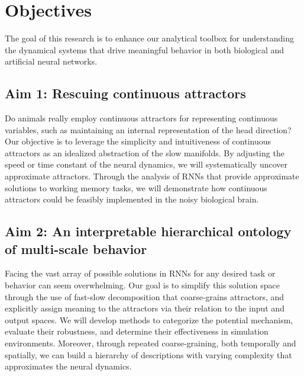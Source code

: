 \documentclass[12pt,letterpaper, onecolumn]{article}
\theoremstyle{definition}
\theoremstyle{remark}
\begin{document}
%


\newpage
\section{Objectives}

The goal of this research is to enhance our analytical toolbox for understanding the dynamical systems that drive meaningful behavior in both biological and artificial neural networks.

\subsection*{Aim 1: Rescuing continuous attractors}
Do animals really employ continuous attractors for representing continuous variables, such as maintaining an internal representation of the head direction?
Our objective is to leverage the simplicity and intuitiveness of continuous attractors as an idealized abstraction of the slow manifolds.
By adjusting the speed or time constant of the neural dynamics, we will systematically uncover approximate attractors.
Through the analysis of RNNs that provide approximate solutions to working memory tasks, we will demonstrate how continuous attractors could be feasibly implemented in the noisy biological brain.

\subsection*{Aim 2: An interpretable hierarchical ontology of multi-scale behavior}
Facing the vast array of possible solutions in RNNs for any desired task or behavior can seem overwhelming.
Our goal is to simplify this solution space through the use of fast-slow decomposition that coarse-grains attractors, and explicitly assign meaning to the attractors via their relation to the input and output spaces.
We will develop methods to categorize the potential mechanism, evaluate their robustness, and determine their effectiveness in simulation environments.
Moreover, through repeated coarse-graining, both temporally and spatially, we can build a hierarchy of descriptions with varying complexity that approximates the neural dynamics.
\end{document}
